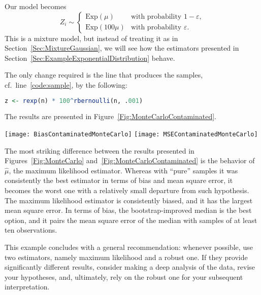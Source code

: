 Our model becomes
\begin{equation}
Z_i \sim \left\{
	\begin{array}{cl}
		\text{Exp}(\mu) & \text{with probability } 1-\varepsilon,\\
		\text{Exp}(100\mu) & \text{with probability } \varepsilon.
	\end{array}
\right.
\end{equation}
This is a mixture model, but instead of treating it as in Section~\ref{Sec:MixtureGaussian}, we will see how the estimators presented in Section~\ref{Sec:ExampleExponentialDistribution} behave.

The only change required is the line that produces the samples, cf.~line~\ref{code:sample}, by the following:
\begin{lstlisting}[frame=lines,numbers=none,language=R]
z <- rexp(n) * 100^rbernoulli(n, .001)
\end{lstlisting}

The results are presented in Figure~\ref{Fig:MonteCarloContaminated}.

\begin{figure*}
	\centering
	{\texttt{[image: BiasContaminatedMonteCarlo]}}
	{\texttt{[image: MSEContaminatedMonteCarlo]}}
	\caption{Bias and mean square error of $\widehat{\mu}$ (ML), $\breve{\mu}$ (Med), and $\widetilde{\mu}$ (BootMed) with contaminated data.}\label{Fig:MonteCarloContaminated}
\end{figure*}

The most striking difference between the results presented in Figures~\ref{Fig:MonteCarlo} and~\ref{Fig:MonteCarloContaminated} is the behavior of $\widehat\mu$, the maximum likelihood estimator.
Whereas with ``pure'' samples it was consistently the best estimator in terms of bias and mean square error, it becomes the worst one with a relatively small departure from such hypothesis.
The maximum likelihood estimator is consistently biased, and it has the largest mean square error.
In terms of bias, the bootstrap-improved median is the best option, and it pairs the mean square error of the median with samples of at least ten observations.

This example concludes with a general recommendation:
whenever possible, use two estimators, namely maximum likelihood and a robust one.
If they provide significantly different results, consider making a deep analysis of the data, revise your hypotheses, and, ultimately, rely on the robust one for your subsequent interpretation.

